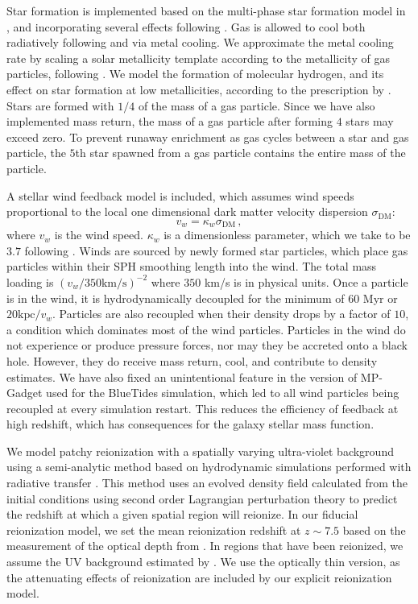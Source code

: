 \documentclass[fleqn,usenatbib]{mnras}
\begin{document}
Star formation is implemented based on the multi-phase star formation model in \cite{2003MNRAS.339..289S}, and incorporating several effects following \cite{Vogelsberger:2013}.
Gas is allowed to cool both radiatively following \cite{1996ApJS..105...19K} and via metal cooling. We approximate the metal cooling rate by scaling a solar metallicity template according to the metallicity of gas particles, following \cite{Vogelsberger:2014}.
We model the formation of molecular hydrogen, and its effect on star formation at low metallicities,
according to the prescription by \cite{2011ApJ...729...36K}. Stars are formed with $1/4$ of the mass of a gas particle. Since we have also implemented mass return, the mass of a gas particle after forming $4$ stars may exceed zero. To prevent runaway enrichment as gas cycles between a star and gas particle, the $5$th star spawned from a gas particle contains the entire mass of the particle.

A stellar wind feedback model \citep{2010MNRAS.406..208O} is included, which assumes wind speeds proportional to the local one dimensional dark matter velocity dispersion $\sigma_\mathrm{DM}$:
\begin{equation}
v_w = \kappa_w \sigma_\mathrm{DM} \,,
\end{equation}
where $v_w$ is the wind speed. $\kappa_w$ is a dimensionless parameter, which we take to be $3.7$ following \cite{Vogelsberger:2013}.
Winds are sourced by newly formed star particles, which place gas particles within their SPH smoothing length into the wind. The total mass loading is $(v_w/ 350 \mathrm{km/s})^{-2}$ where $350$ km/s is in physical units. Once a particle is in the wind, it is hydrodynamically decoupled for the minimum of $60$ Myr or $20 \mathrm{kpc} / v_w$. Particles are also recoupled when their density drops by a factor of $10$, a condition which dominates most of the wind particles. Particles in the wind do not experience or produce pressure forces, nor may they be accreted onto a black hole. However, they do receive mass return, cool, and contribute to density estimates.
We have also fixed an unintentional feature in the version of MP-Gadget used for the BlueTides simulation, which led to all wind particles being recoupled at every simulation restart. This reduces the efficiency of feedback at high redshift, which has consequences for the galaxy stellar mass function.

We model patchy reionization with a spatially varying ultra-violet background using a semi-analytic method based on hydrodynamic simulations performed with radiative transfer \citep[for more details see][]{2013ApJ...776...81B}.
This method uses an evolved density field calculated from the initial conditions using second order Lagrangian perturbation theory to predict
the redshift at which a given spatial region will reionize.
In our fiducial reionization model, we set the mean reionization redshift at $z \sim 7.5$ based on the measurement of the optical depth from \cite{Planck}. In regions that have been reionized, we assume the UV background estimated by \cite{2020MNRAS.493.1614F}. We use the optically thin version, as the attenuating effects of reionization are included by our explicit reionization model.
\end{document}
